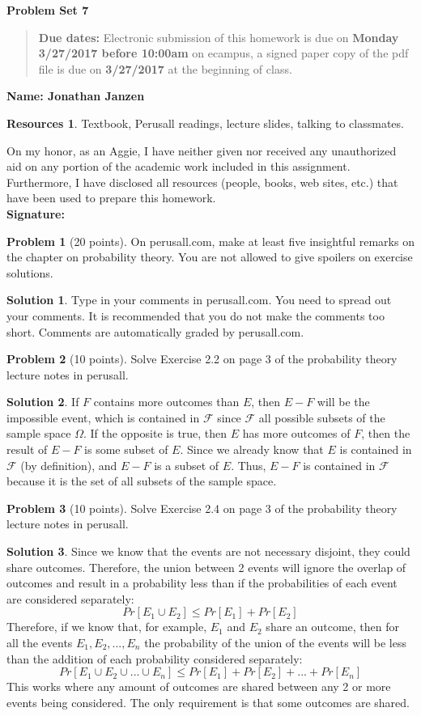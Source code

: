 \documentclass{article}
\theoremstyle{definition}
\newtheorem{problem}{Problem}
\newtheorem*{solution}{Solution}
\newtheorem*{resources}{Resources}
\newcommand{\name}[1]{\noindent\textbf{Name: #1}}
\newcommand{\honor}{\noindent On my honor, as an Aggie, I have neither
  given nor received any unauthorized aid on any portion of the
  academic work included in this assignment. Furthermore, I have
  disclosed all resources (people, books, web sites, etc.) that have
  been used to prepare this homework. \\[1ex]
 \textbf{Signature:} \underline{\hspace*{5cm}} }
\newcommand{\problemset}[1]{\begin{center}\textbf{Problem Set
      #1}\end{center}}
\newcommand{\duedate}[2]{\begin{quote}\textbf{Due dates:} Electronic
    submission of this homework is due on \textbf{#1} on ecampus, a
    signed paper copy of the pdf file is due on \textbf{#2} at the
    beginning of class. \end{quote} }
\begin{document}
\problemset{7}
\duedate{Monday 3/27/2017 before 10:00am}{3/27/2017}
\name{Jonathan Janzen}
\begin{resources}
Textbook, Perusall readings, lecture slides, talking to classmates.
\end{resources}
\honor

\begin{problem}[20 points] 
On perusall.com, make at least five insightful remarks on the chapter on
probability theory. You are not allowed to give spoilers on exercise
solutions. 
\end{problem}
\begin{solution} Type in your comments in perusall.com. You need to
  spread out your comments. It is recommended that you do not make the
  comments too short. Comments are automatically graded by
  perusall.com. 
\end{solution}

\begin{problem}[10 points] 
Solve Exercise 2.2 on page 3 of the probability theory lecture notes
in perusall. 
\end{problem}
\begin{solution} If $F$ contains more outcomes than $E$, then $E-F$ will be the impossible event, which is contained in $\mathcal{F}$ since $\mathcal{F}$ all possible subsets of the sample space $\Omega$. If the opposite is true, then $E$ has more outcomes of $F$, then the result of $E-F$ is some subset of $E$. Since we already know that $E$ is contained in $\mathcal{F}$ (by definition), and $E-F$ is a subset of $E$. Thus, $E-F$ is contained in $\mathcal{F}$ because it is the set of all subsets of the sample space.
\end{solution}

\begin{problem}[10 points] 
Solve Exercise 2.4 on page 3 of the probability theory lecture notes
in perusall. 
\end{problem}
\begin{solution}
Since we know that the events are not necessary disjoint, they could share outcomes. Therefore, the union between 2 events will ignore the overlap of outcomes and result in a probability less than if the probabilities of each event are considered separately:
$$ Pr[E_1 \cup E_2] \leq Pr[E_1] + Pr[E_2] $$
Therefore, if we know that, for example, $E_1$ and $E_2$ share an outcome, then for all the events $E_1,E_2,...,E_n$ the probability of the union of the events will be less than the addition of each probability considered separately:
$$ Pr[E_1 \cup E_2 \cup ... \cup E_n] \leq Pr[E_1] + Pr[E_2] + ... + Pr[E_n] $$
This works where any amount of outcomes are shared between any 2 or more events being considered. The only requirement is that some outcomes are shared.
\end{solution}
\end{document}
